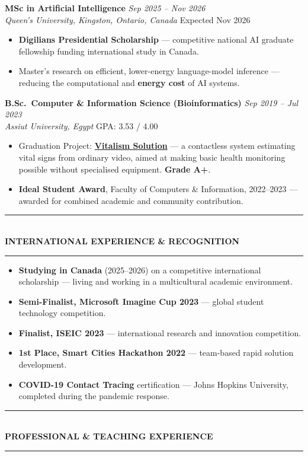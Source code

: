 \documentclass[10pt, a4paper]{article}
\newcommand{\cvsection}[1]{%
  \vspace{3pt}%
  {\color{navy}\rule{\linewidth}{1.1pt}}\\[0.5pt]%
  {\color{navy}\bfseries\fontsize{9.5}{11}\selectfont\uppercase{#1}}\\[-4pt]%
  {\color{teal}\rule{\linewidth}{0.6pt}}%
  \vspace{2pt}%
}
\newcommand{\cventry}[4]{%
  \vspace{2.5pt}%
  \textbf{\color{darkgray}#1} \hfill {\color{midgray}\textit{#3}}\\[-1.5pt]%
  {\color{teal}\textit{#2}} \hfill {\color{midgray}#4}%
}
\newenvironment{cvitems}{%
  \begin{itemize}[leftmargin=11pt, itemsep=0.5pt, parsep=0pt, topsep=1pt,
                  label={\textcolor{teal}{$\bullet$}}]
}{%
  \end{itemize}%
}
\begin{document}
\cventry{MSc in Artificial Intelligence}{Queen's University, Kingston, Ontario, Canada}
        {Sep 2025 -- Nov 2026}{Expected Nov 2026}
\begin{cvitems}
  \item \textbf{Digilians Presidential Scholarship} --- competitive national AI graduate fellowship funding international study in Canada.
  \item Master's research on efficient, lower-energy language-model inference --- reducing the computational and \textbf{energy cost} of AI systems.
\end{cvitems}

\cventry{B.Sc.\ Computer \& Information Science (Bioinformatics)}{Assiut University, Egypt}
        {Sep 2019 -- Jul 2023}{GPA: 3.53 / 4.00}
\begin{cvitems}
  \item Graduation Project: \href{https://vitalismsolution.github.io/}{\textbf{Vitalism Solution}} --- a contactless system estimating vital signs from ordinary video, aimed at making basic health monitoring possible without specialised equipment. \textbf{Grade A+}.
  \item \textbf{Ideal Student Award}, Faculty of Computers \& Information, 2022--2023 --- awarded for combined academic and community contribution.
\end{cvitems}

\cvsection{International Experience \& Recognition}

\begin{cvitems}
  \item \textbf{Studying in Canada} (2025--2026) on a competitive international scholarship --- living and working in a multicultural academic environment.
  \item \textbf{Semi-Finalist, Microsoft Imagine Cup 2023} --- global student technology competition.
  \item \textbf{Finalist, ISEIC 2023} --- international research and innovation competition.
  \item \textbf{1st Place, Smart Cities Hackathon 2022} --- team-based rapid solution development.
  \item \textbf{COVID-19 Contact Tracing} certification --- Johns Hopkins University, completed during the pandemic response.
\end{cvitems}

\cvsection{Professional \& Teaching Experience}
\end{document}
